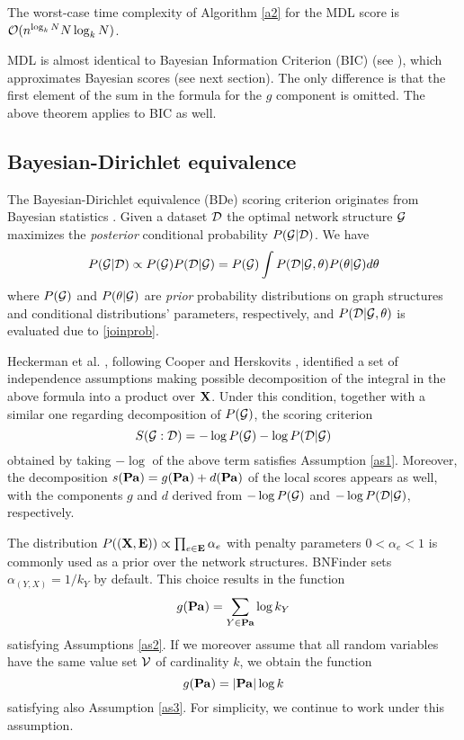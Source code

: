  \begin{theorem}
 The worst-case time complexity of Algorithm \ref{a2} for the MDL score is $\mathcal{O}(n^{\log_k N}N\log_k N)$.
 \end{theorem}
 
 MDL is almost identical to Bayesian Information Criterion (BIC) 
 (see \cite{neapolitan03}), 
 which approximates Bayesian scores (see next section).
 The only difference is that the first element of the sum in the formula 
 for the $g$ component is omitted. The above theorem applies to BIC as well.
 
\subsection{Bayesian-Dirichlet equivalence}

 The Bayesian-Dirichlet equivalence (BDe) scoring criterion originates from Bayesian statistics \cite{cooper92}. 
 Given a dataset $\mathcal{D}$ the optimal network structure $\mathcal{G}$ maximizes the \emph{posterior} conditional probability $P(\mathcal{G}|\mathcal{D})$. 
 We have 
 $$P(\mathcal{G}|\mathcal{D})\propto P(\mathcal{G})P(\mathcal{D}|\mathcal{G})=P(\mathcal{G})\int P(\mathcal{D}|\mathcal{G},\theta)P(\theta|\mathcal{G})d\theta$$
 where $P(\mathcal{G})$ and $P(\theta|\mathcal{G})$ are \emph{prior} probability distributions on graph structures and conditional distributions' parameters, respectively, and $P(\mathcal{D}|\mathcal{G},\theta)$ is evaluated due to \eqref{joinprob}.
 
 Heckerman et al. \cite{heckerman95}, following Cooper and Herskovits \cite{cooper92}, identified a set of independence assumptions making possible decomposition of the integral in the above formula into a product over $\mathbf{X}$.
 Under this condition, together with a similar one regarding decomposition of $P(\mathcal{G})$, the scoring criterion
 $$S(\mathcal{G}:\mathcal{D})=-\log P(\mathcal{G})-\log P(\mathcal{D}|\mathcal{G})$$
 obtained by taking $-\log$ of the above term satisfies Assumption \ref{as1}. 
 Moreover, the decomposition $s(\mathbf{Pa})=g(\mathbf{Pa})+d(\mathbf{Pa})$ of the local scores appears as well, with the components $g$ and $d$ derived from $-\log P(\mathcal{G})$ and $-\log P(\mathcal{D}|\mathcal{G})$, respectively.


 The distribution $P((\mathbf{X},\mathbf{E}))\propto\prod_{e\in\mathbf{E}}\alpha_{e}$ 
 with penalty parameters $0<\alpha_e<1$ 
 is commonly used as a prior over the network structures. 
 BNFinder sets $\alpha_{(Y,X)}=1/k_Y$ by default.
 This choice results in the function 
 $$g(\mathbf{Pa})=\sum_{Y\in\mathbf{Pa}}\log k_Y$$ 
 satisfying Assumptions \ref{as2}.
 If we moreover assume that all random variables 
 have the same value set $\mathcal{V}$ of cardinality $k$,
 we obtain the function
 $$g(\mathbf{Pa})=|\mathbf{Pa}|\log k$$ 
 satisfying also Assumption \ref{as3}.
 For simplicity, we continue to work under this assumption.

